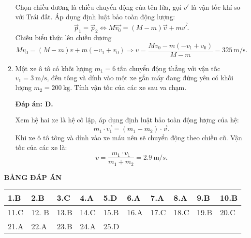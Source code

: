\begin{enumerate}[label=\bfseries Câu \arabic*:]
{		Chọn chiều dương là chiều chuyển động của tên lửa, gọi $v'$ là vận tốc khí so với Trái đất. Áp dụng định luật bảo toàn động lượng: 
		\begin{equation*}
			\vec{p}_1=\vec{p}_2  
			\Leftrightarrow M\vec{v_0}=(M-m)\vec{v} + m\vec{v'}.
		\end{equation*}
		Chiếu biểu thức lên chiều dương 
		\begin{equation*}
			Mv_0=(M-m)v+m(-v_1+v_0)
			\Rightarrow v= \frac{Mv_0 - m(-v_1+v_0)}{M-m}=\SI{325}{\meter/\second}.
		\end{equation*}
	
	}
		\item {}
	
	
	{Một xe ô tô có khối lượng $m_1 = 6\ \text{tấn}$ chuyển động thẳng với vận tốc $v_1=3\ \text{m/s}$, đến tông và dính vào một xe gắn máy đang đứng yên có khối lượng $m_2 = 200\ \text{kg}$. Tính vận tốc của các xe sau va chạm.
	}
	
	\hideall
	{	
		\textbf{Đáp án: D.}
		
		Xem hệ hai xe là hệ cô lập, áp dụng định luật bảo toàn động lượng của hệ: 
		$$m_1 \cdot \vec{v_1} = (m_1+m_2)\cdot \vec{v}.$$
		Khi xe ô tô tông và dính vào xe máu nên sẽ chuyển động theo chiều cũ. Vận tốc của các xe là:
		$$v=\frac{m_1 \cdot v_1}{m_1+m_2}= \SI{2.9}{\meter/s}.$$
	}
\end{enumerate}

\hideall
{
	\begin{center}
		\textbf{BẢNG ĐÁP ÁN}
	\end{center}
	\begin{center}
		\begin{tabular}{|m{2.8em}|m{2.8em}|m{2.8em}|m{2.8em}|m{2.8em}|m{2.8em}|m{2.8em}|m{2.8em}|m{2.8em}|m{2.8em}|}
			\hline
			1.B  & 2.B  & 3.C  & 4.A  & 5.D  & 6.A  & 7.A  & 8.A  & 9.B  & 10.B  \\
			\hline
			11.C  & 12. B  & 13.B  & 14.C  & 15.B  & 16.A  & 17.C  & 18.C  & 19.B  & 20.C  \\
			\hline
			21.A  & 22.A  & 23.B  & 24.A  & 25.D  &   &   &   &   &  \\
			\hline
		\end{tabular}
	\end{center}
}